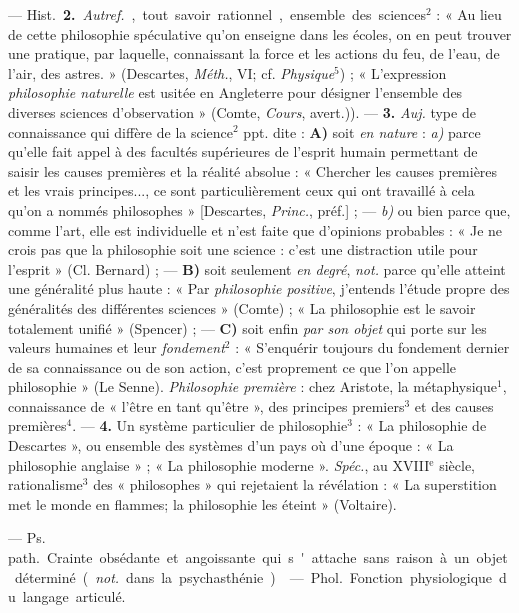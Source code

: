\begin{itemize}[leftmargin=1cm, label=, itemsep=1pt]
— \si{Hist.} {\bf 2.} {\it Autref.}, tout savoir rationnel, ensemble des
sciences$^2$ : « Au lieu de cette philosophie spéculative qu’on enseigne dans
les écoles, on en peut trouver une pratique, par laquelle, connaissant la
force et les actions du feu, de l’eau, de l'air, des astres. » (Descartes,
{\it Méth.}, VI; cf. {\it Physique}$^5$) ; « L'expression {\it philosophie
naturelle} est usitée en Angleterre pour désigner l’ensemble des diverses
sciences d'observation » (Comte, {\it Cours}, avert.)). — {\bf 3.} {\it Auj.}
type de connaissance qui diffère de la science$^2$ ppt. dite : {\bf A)} soit
{\it en nature} : {\it a)} parce qu’elle fait appel à des facultés
supérieures de l’esprit
humain permettant de saisir les causes premières et la réalité absolue : «
Chercher les causes premières et les vrais principes..., ce sont
particulièrement ceux qui ont travaillé à cela qu’on a nommés philosophes
» [Descartes, {\it Princ.}, préf.] ; — {\it b)} ou bien parce que, comme
l’art, elle est individuelle et n’est faite que d'opinions probables : « Je
ne crois pas que la philosophie soit une science : c’est une distraction
utile pour l'esprit » (Cl. Bernard) ; — {\bf B)} soit seulement {\it en
degré}, {\it not.} parce qu’elle atteint une généralité plus haute : « Par
{\it philosophie positive}, j'entends l’étude propre des généralités des
différentes sciences » (Comte) ; « La philosophie est le savoir totalement
unifié » (Spencer) ; — {\bf C)} soit enfin {\it par son objet} qui porte sur
les valeurs humaines et leur {\it fondement}$^2$ : « S’enquérir toujours du
fondement dernier de sa connaissance ou de son action, c’est proprement ce
que l’on appelle philosophie » (Le Senne). {\it Philosophie première} : chez
Aristote, la métaphysique$^1$, connaissance de « l'être en tant qu'être »,
des principes premiers$^3$ et des causes premières$^4$. — {\bf 4.} Un système
particulier de philosophie$^3$ : « La philosophie de Descartes », ou ensemble
des systèmes d'un pays où d’une époque : « La philosophie anglaise » ; « La
philosophie moderne ». {\it Spéc.}, au {\footnotesize XVIII}$^\text{e}$
siècle, rationalisme$^3$ des « philosophes » qui rejetaient la révélation : «
La superstition met le monde en flammes; la philosophie les éteint
» (Voltaire).

 — \si{Ps. path.} Crainte obsédante et angoissante qui s'attache
sans raison à un objet déterminé ({\it not.} dans la psychasthénie).

 — \si{Phol.} Fonction physiologique du langage articulé.


\end{itemize}
